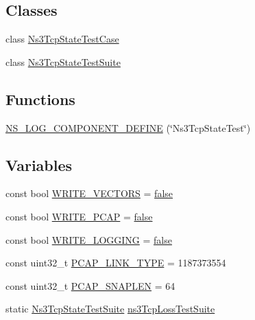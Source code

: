 \subsection*{Classes}
\begin{DoxyCompactItemize}
\item 
class \hyperlink{classNs3TcpStateTestCase}{Ns3\+Tcp\+State\+Test\+Case}
\item 
class \hyperlink{classNs3TcpStateTestSuite}{Ns3\+Tcp\+State\+Test\+Suite}
\end{DoxyCompactItemize}
\subsection*{Functions}
\begin{DoxyCompactItemize}
\item 
\hyperlink{ns3tcp-state-test-suite_8cc_a1a165be61435ba28281923f964704b2f}{N\+S\+\_\+\+L\+O\+G\+\_\+\+C\+O\+M\+P\+O\+N\+E\+N\+T\+\_\+\+D\+E\+F\+I\+NE} (\char`\"{}Ns3\+Tcp\+State\+Test\char`\"{})
\end{DoxyCompactItemize}
\subsection*{Variables}
\begin{DoxyCompactItemize}
\item 
const bool \hyperlink{ns3tcp-state-test-suite_8cc_a6829179e1fbdbc03f407d65a63c07153}{W\+R\+I\+T\+E\+\_\+\+V\+E\+C\+T\+O\+RS} = \hyperlink{lte__cqi__generation_8m_ab1bef239d413c4da139c4bac92cd657a}{false}
\item 
const bool \hyperlink{ns3tcp-state-test-suite_8cc_a9ba71edaadfde927e9912e6b37a37f39}{W\+R\+I\+T\+E\+\_\+\+P\+C\+AP} = \hyperlink{lte__cqi__generation_8m_ab1bef239d413c4da139c4bac92cd657a}{false}
\item 
const bool \hyperlink{ns3tcp-state-test-suite_8cc_ad6baebe9f475ef91ab29a12e30e30e7b}{W\+R\+I\+T\+E\+\_\+\+L\+O\+G\+G\+I\+NG} = \hyperlink{lte__cqi__generation_8m_ab1bef239d413c4da139c4bac92cd657a}{false}
\item 
const uint32\+\_\+t \hyperlink{ns3tcp-state-test-suite_8cc_a1d33ea10cde9143eb9b36be021f3739e}{P\+C\+A\+P\+\_\+\+L\+I\+N\+K\+\_\+\+T\+Y\+PE} = 1187373554
\item 
const uint32\+\_\+t \hyperlink{ns3tcp-state-test-suite_8cc_ae9a6b49b98d0c7917dda456f6771d2e1}{P\+C\+A\+P\+\_\+\+S\+N\+A\+P\+L\+EN} = 64
\item 
static \hyperlink{classNs3TcpStateTestSuite}{Ns3\+Tcp\+State\+Test\+Suite} \hyperlink{ns3tcp-state-test-suite_8cc_a6169977fe0abd5540543bba88f68c470}{ns3\+Tcp\+Loss\+Test\+Suite}
\end{DoxyCompactItemize}


